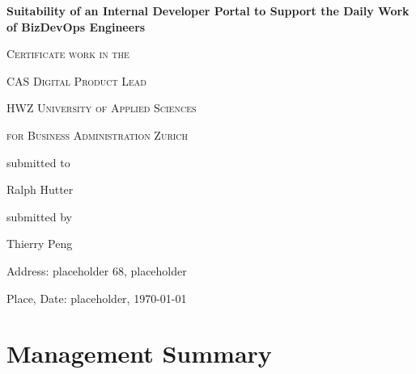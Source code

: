 \documentclass[a4paper,12pt]{article}
\begin{document}
    \begin{titlepage}
        \begin{center}
        {\huge\bfseries Suitability of an Internal Developer Portal to Support the Daily Work of BizDevOps Engineers\par}
            \vspace{2cm}

            {\scshape\large Certificate work in the \par}
            {\scshape\large CAS Digital Product Lead \par}
            \vspace{1cm}

            {\scshape\large HWZ University of Applied Sciences \par}
            {\scshape\large for Business Administration Zurich \par}
            \vspace{4cm}

            {\normalsize submitted to\par}
            \vspace{0.5cm}

            {\large Ralph Hutter\par}
            \vfill
            {\normalsize submitted by\par}
            \vspace{0.5cm}
            {\large Thierry Peng\par}
            \vspace{0.5cm}
            {\normalsize Address: placeholder 68, placeholder\par}
            {\normalsize  Place, Date: placeholder, \today\par}

        \end{center}
    \end{titlepage}


    \section*{Management Summary}
    \pagebreak


    \tableofcontents
    \pagebreak
\end{document}

